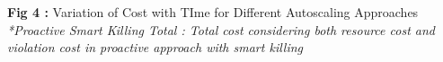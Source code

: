 \textbf{Fig 4 :} Variation of Cost with TIme for Different Autoscaling Approaches \\
\textit{*Proactive Smart Killing Total : Total cost considering both resource cost and violation cost in proactive approach with smart killing}